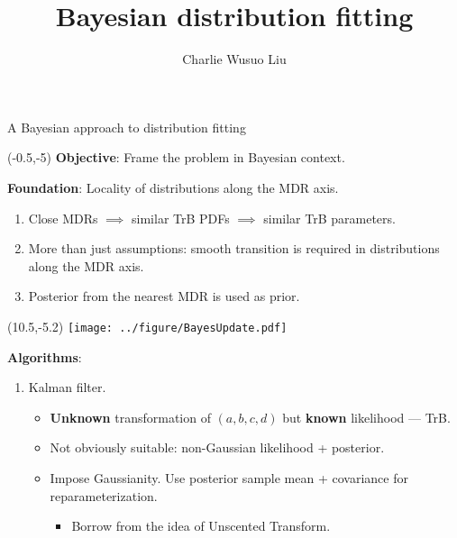 \documentclass[aspectratio=169]{beamer}
\title{Bayesian distribution fitting}
\author{Charlie Wusuo Liu}
\begin{document}

\begin{frame}{A Bayesian approach to distribution fitting}
\begin{textblock}{10.5}(-0.5,-5)
\tiny\textbf{Objective}: Frame the problem in Bayesian context.\medskip

\tiny\textbf{Foundation}: Locality of distributions along the MDR axis.\medskip

\begin{enumerate}
\item Close MDRs $\implies$ similar TrB PDFs $\implies$ similar TrB parameters.\medskip

\item More than just assumptions: smooth transition is required in distributions along the MDR axis.\medskip 

\item Posterior from the nearest MDR is used as prior.\medskip
\end{enumerate}%

\begin{textblock}{1}(10.5,-5.2)
\texttt{[image: ../figure/BayesUpdate.pdf]}
\end{textblock}%

\tiny\textbf{Algorithms}:\medskip

\begin{enumerate}

\tiny\item Kalman filter.\medskip

\begin{itemize}

\tiny\item \textbf{Unknown} transformation of $(a, b, c, d)$ but \textbf{known} likelihood --- TrB.\medskip 

\tiny\item Not obviously suitable: non-Gaussian likelihood + posterior. \medskip

\tiny\item Impose Gaussianity. Use posterior sample mean + covariance for reparameterization.\medskip

\begin{itemize}
\tiny\item Borrow from the idea of Unscented Transform.\medskip
\end{itemize}
\end{itemize}
\end{enumerate}
\end{textblock}


\end{frame}
\end{document}
